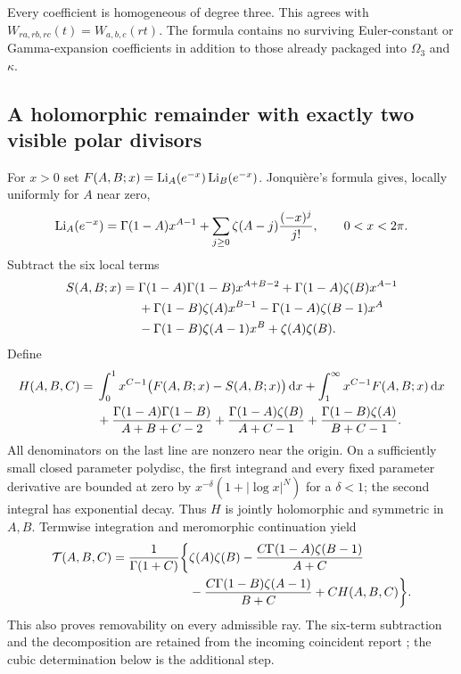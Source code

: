 Every coefficient is homogeneous of degree three. This agrees with
$W_{ra,rb,rc}(t)=W_{a,b,c}(rt)$. The formula contains no surviving
Euler-constant or Gamma-expansion coefficients in addition to those
already packaged into $\Omega_3$ and $\kappa$.

\subsection{A holomorphic remainder with exactly two visible polar divisors}

For $x>0$ set $F(A,B;x)=\operatorname{Li}_A(e^{-x})\operatorname{Li}_B(e^{-x})$.
Jonqui\`ere's formula gives, locally uniformly for $A$ near zero,
\begin{equation}\label{ray:Jonquiere}
 \operatorname{Li}_A(e^{-x})=\Gamma(1-A)x^{A-1}
       +\sum_{j\ge0}\zeta(A-j)\frac{(-x)^j}{j!},\qquad 0<x<2\pi.
\end{equation}
Subtract the six local terms
\begin{align}
 S(A,B;x)={}&\Gamma(1-A)\Gamma(1-B)x^{A+B-2}
 +\Gamma(1-A)\zeta(B)x^{A-1}\notag\\
 &+\Gamma(1-B)\zeta(A)x^{B-1}
 -\Gamma(1-A)\zeta(B-1)x^A\notag\\
 &-\Gamma(1-B)\zeta(A-1)x^B+\zeta(A)\zeta(B).
 \label{ray:S}
\end{align}
Define
\begin{align}
 H(A,B,C)={}&\int_0^1x^{C-1}\bigl(F(A,B;x)-S(A,B;x)\bigr)\,\mathrm d x
       +\int_1^\infty x^{C-1}F(A,B;x)\,\mathrm d x\notag\\
 &+\frac{\Gamma(1-A)\Gamma(1-B)}{A+B+C-2}
 +\frac{\Gamma(1-A)\zeta(B)}{A+C-1}
 +\frac{\Gamma(1-B)\zeta(A)}{B+C-1}.
 \label{ray:H}
\end{align}
All denominators on the last line are nonzero near the origin.
On a sufficiently small closed parameter polydisc, the first integrand
and every fixed parameter derivative are bounded at zero by
$x^{-\delta}(1+|\log x|^N)$ for a $\delta<1$; the second integral
has exponential decay. Thus $H$ is jointly holomorphic and symmetric
in $A,B$. Termwise integration and meromorphic continuation yield
\begin{equation}\label{ray:decomposition}
 \begin{split}
 \mathcal T(A,B,C)=\frac1{\Gamma(1+C)}\biggl\{&\zeta(A)\zeta(B)
 -\frac{C\Gamma(1-A)\zeta(B-1)}{A+C}\\
 &-\frac{C\Gamma(1-B)\zeta(A-1)}{B+C}
 +CH(A,B,C)\biggr\}.
 \end{split}
\end{equation}
This also proves removability on every admissible ray. The six-term
subtraction and the decomposition are retained from the incoming
coincident report \cite{IncomingCoincident}; the cubic determination
below is the additional step.

